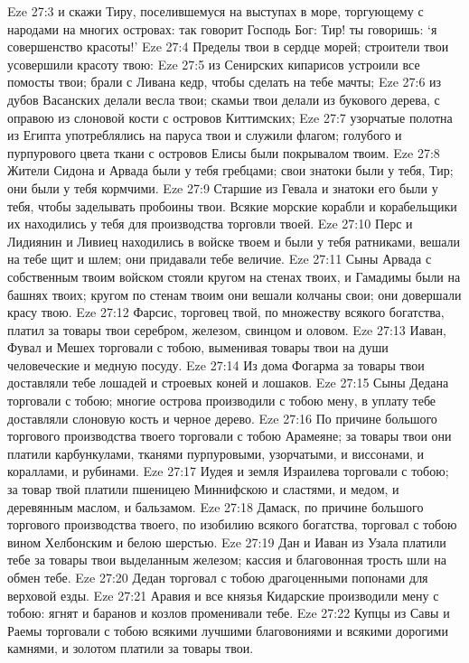 Eze 27:3  и скажи Тиру, поселившемуся на выступах в море, торгующему с народами на многих островах: так говорит Господь Бог: Тир! ты говоришь: `я совершенство красоты!'
Eze 27:4  Пределы твои в сердце морей; строители твои усовершили красоту твою:
Eze 27:5  из Сенирских кипарисов устроили все помосты твои; брали с Ливана кедр, чтобы сделать на тебе мачты;
Eze 27:6  из дубов Васанских делали весла твои; скамьи твои делали из букового дерева, с оправою из слоновой кости с островов Киттимских;
Eze 27:7  узорчатые полотна из Египта употреблялись на паруса твои и служили флагом; голубого и пурпурового цвета ткани с островов Елисы были покрывалом твоим.
Eze 27:8  Жители Сидона и Арвада были у тебя гребцами; свои знатоки были у тебя, Тир; они были у тебя кормчими.
Eze 27:9  Старшие из Гевала и знатоки его были у тебя, чтобы заделывать пробоины твои. Всякие морские корабли и корабельщики их находились у тебя для производства торговли твоей.
Eze 27:10  Перс и Лидиянин и Ливиец находились в войске твоем и были у тебя ратниками, вешали на тебе щит и шлем; они придавали тебе величие.
Eze 27:11  Сыны Арвада с собственным твоим войском стояли кругом на стенах твоих, и Гамадимы были на башнях твоих; кругом по стенам твоим они вешали колчаны свои; они довершали красу твою.
Eze 27:12  Фарсис, торговец твой, по множеству всякого богатства, платил за товары твои серебром, железом, свинцом и оловом.
Eze 27:13  Иаван, Фувал и Мешех торговали с тобою, выменивая товары твои на души человеческие и медную посуду.
Eze 27:14  Из дома Фогарма за товары твои доставляли тебе лошадей и строевых коней и лошаков.
Eze 27:15  Сыны Дедана торговали с тобою; многие острова производили с тобою мену, в уплату тебе доставляли слоновую кость и черное дерево.
Eze 27:16  По причине большого торгового производства твоего торговали с тобою Арамеяне; за товары твои они платили карбункулами, тканями пурпуровыми, узорчатыми, и виссонами, и кораллами, и рубинами.
Eze 27:17  Иудея и земля Израилева торговали с тобою; за товар твой платили пшеницею Миннифскою и сластями, и медом, и деревянным маслом, и бальзамом.
Eze 27:18  Дамаск, по причине большого торгового производства твоего, по изобилию всякого богатства, торговал с тобою вином Хелбонским и белою шерстью.
Eze 27:19  Дан и Иаван из Узала платили тебе за товары твои выделанным железом; кассия и благовонная трость шли на обмен тебе.
Eze 27:20  Дедан торговал с тобою драгоценными попонами для верховой езды.
Eze 27:21  Аравия и все князья Кидарские производили мену с тобою: ягнят и баранов и козлов променивали тебе.
Eze 27:22  Купцы из Савы и Раемы торговали с тобою всякими лучшими благовониями и всякими дорогими камнями, и золотом платили за товары твои.
